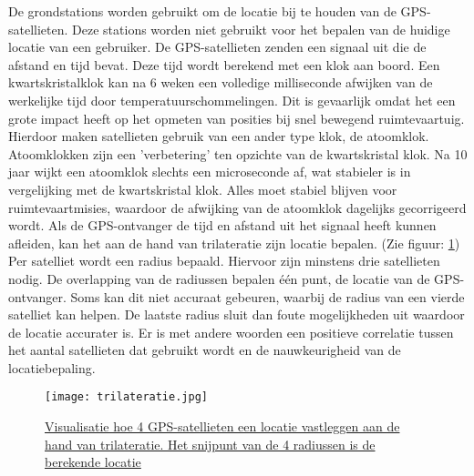 De grondstations worden gebruikt om de locatie bij te houden van de GPS-satellieten. Deze stations worden niet gebruikt voor het bepalen van de huidige locatie van een gebruiker. 
\newline
\newline
De GPS-satellieten zenden een signaal uit die de afstand en tijd bevat. Deze tijd wordt berekend met een klok aan boord. Een kwartskristalklok kan na 6 weken een volledige milliseconde afwijken van de werkelijke tijd door temperatuurschommelingen. Dit is gevaarlijk omdat het een grote impact heeft op het opmeten van posities bij snel bewegend ruimtevaartuig. Hierdoor maken satellieten gebruik van een ander type klok, de atoomklok. Atoomklokken zijn een 'verbetering' ten opzichte van de kwartskristal klok.  Na 10 jaar wijkt een atoomklok slechts een microseconde af, wat stabieler is in vergelijking met de kwartskristal klok. Alles moet stabiel blijven voor ruimtevaartmisies, waardoor de afwijking van de atoomklok dagelijks gecorrigeerd wordt. \autocite{atomic_clock}
\newline
Als de GPS-ontvanger de tijd en afstand uit het signaal heeft kunnen afleiden, kan het aan de hand van trilateratie zijn locatie bepalen. (Zie figuur: \ref{fig:trilateratie})
Per satelliet wordt een radius bepaald. Hiervoor zijn minstens drie satellieten nodig. De overlapping van de radiussen bepalen één punt, de locatie van de GPS-ontvanger. Soms kan dit niet accuraat gebeuren, waarbij de radius van een vierde satelliet kan helpen. De laatste radius sluit dan foute mogelijkheden uit waardoor de locatie accurater is. Er is met andere woorden een positieve correlatie tussen het aantal satellieten dat gebruikt wordt en de nauwkeurigheid van de locatiebepaling. \autocite{gps}

\begin{figure}
	\texttt{[image: trilateratie.jpg]}
	\caption[Werking trilateratie]{\href{https://gisgeography.com/trilateration-triangulation-gps/}{Visualisatie hoe 4 GPS-satellieten een locatie vastleggen aan de hand van trilateratie. Het snijpunt van de 4 radiussen is de berekende locatie \autocite{img_trilateratie}}}
	\label{fig:trilateratie}
\end{figure} 
\pagebreak
